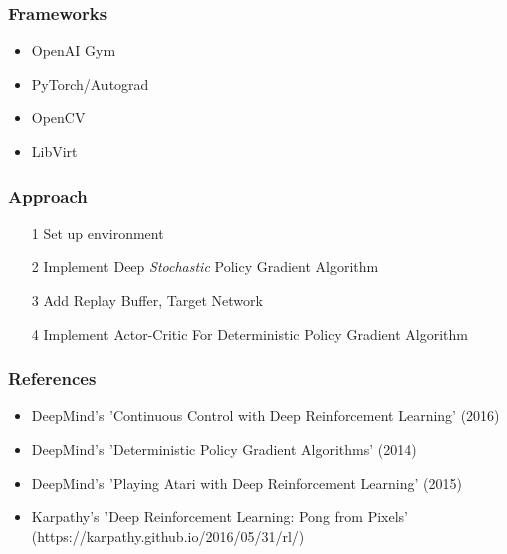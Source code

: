\documentclass{beamer}
\begin{document}
\begin{frame}
	\frametitle{Frameworks}
	\begin{itemize}
		\item OpenAI Gym \\
		\item PyTorch/Autograd \\
		\item OpenCV \\
		\item LibVirt
	\end{itemize}
\end{frame}

\begin{frame}
	\frametitle{Approach}
	\begin{itemize}
		\item[1] Set up environment \\	
		\item[2] Implement Deep \emph{Stochastic} Policy Gradient Algorithm \\
		\item[3] Add Replay Buffer, Target Network
		\item[4] Implement Actor-Critic For Deterministic Policy Gradient Algorithm
	\end{itemize}
\end{frame}
\begin{frame}
	\frametitle{References}
	\begin{itemize}
		\item DeepMind's 'Continuous Control with Deep Reinforcement Learning' (2016) \\
		\item DeepMind's 'Deterministic Policy Gradient Algorithms' (2014) \\
		\item DeepMind's 'Playing Atari with Deep Reinforcement Learning' (2015) \\
		\item Karpathy's 'Deep Reinforcement Learning: Pong from Pixels' (https://karpathy.github.io/2016/05/31/rl/)
	\end{itemize}
\end{frame}
\end{document}
